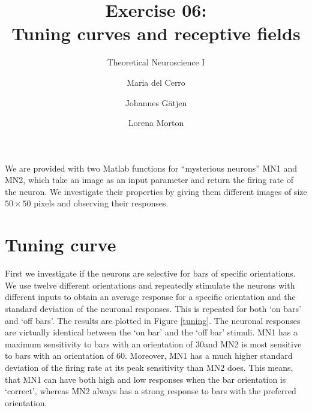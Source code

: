 \documentclass{scrartcl}
\title{Exercise 06:\\Tuning curves and receptive fields}
\subtitle{Theoretical Neuroscience I}
\author{Maria del Cerro \and Johannes G\"atjen \and Lorena Morton}
\begin{document}
\maketitle

We are provided with two Matlab functions for ``mysterious neurons'' MN1 and MN2, which take an image as an input parameter and return the firing rate of the neuron. We investigate their properties by giving them different images of size $50\times 50$ pixels and observing their responses.

\section{Tuning curve}

First we investigate if the neurons are selective for bars of specific orientations. We use twelve different orientations and repeatedly stimulate the neurons with different inputs to obtain an average response for a specific orientation and the standard deviation of the neuronal responses. This is repeated for both `on bars' and `off bars'. The results are plotted in Figure \ref{tuning}. The neuronal responses are virtually identical between the `on bar' and the `off bar' stimuli. MN1 has a maximum sensitivity to bars with an orientation of 30\degree and MN2 is most sensitive to bars with an orientation of 60\degree. Moreover, MN1 has a much higher standard deviation of the firing rate at its peak sensitivity than MN2 does. This means, that MN1 can have both high and low responses when the bar orientation is `correct', whereas MN2 always has a strong response to bars with the preferred orientation.
\end{document}
